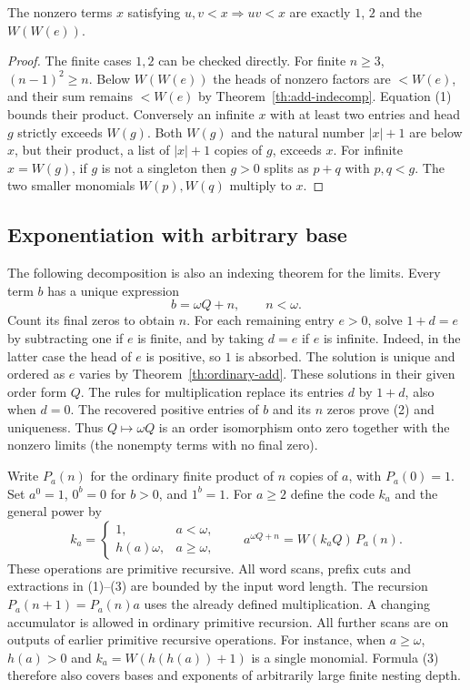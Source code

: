 \begin{corollary}
The nonzero terms $x$ satisfying
$u,v<x\Rightarrow uv<x$ are exactly $1$, $2$ and the $W(W(e))$.
\end{corollary}
\begin{proof}
The finite cases $1,2$ can be checked directly. For finite $n\ge3$,
$(n-1)^2\ge n$. Below $W(W(e))$ the heads of nonzero factors are
$<W(e)$, and their sum remains $<W(e)$ by Theorem~\ref{th:add-indecomp}.
Equation (1) bounds their product. Conversely an infinite $x$ with at
least two entries and head $g$ strictly exceeds $W(g)$. Both $W(g)$
and the natural number $|x|+1$ are below $x$, but their product, a list
of $|x|+1$ copies of $g$, exceeds $x$. For infinite $x=W(g)$, if
$g$ is not a singleton then $g>0$ splits as $p+q$ with $p,q<g$.
The two smaller monomials $W(p),W(q)$ multiply to $x$.
\end{proof}

\subsection{Exponentiation with arbitrary base}
The following decomposition is also an indexing theorem for the limits.
Every term $b$ has a unique expression
\[
                         b=\omega Q+n,\qquad n<\omega.            \tag{2}\label{eq:arith-omega-div}
\]
Count its final zeros to obtain $n$. For each remaining entry $e>0$,
solve $1+d=e$ by subtracting one if $e$ is finite, and by taking $d=e$
if $e$ is infinite. Indeed, in the latter case the head of $e$ is
positive, so $1$ is absorbed. The solution is unique and ordered as
$e$ varies by Theorem~\ref{th:ordinary-add}. These solutions in their
given order form $Q$. The rules for multiplication replace its entries
$d$ by $1+d$, also when $d=0$. The recovered positive entries of $b$
and its $n$ zeros prove (2) and uniqueness. Thus $Q\mapsto\omega Q$ is
an order isomorphism onto zero together with the nonzero limits (the
nonempty terms with no final zero).

Write $P_a(n)$ for the ordinary finite product of $n$ copies of $a$,
with $P_a(0)=1$. Set $a^0=1$, $0^b=0$ for $b>0$, and $1^b=1$.
For $a\ge2$ define the code $k_a$ and the general power by
\[
 k_a=\begin{cases}1,&a<\omega,\\ h(a)\omega,&a\ge\omega,\end{cases}
 \qquad
 a^{\omega Q+n}=W(k_a Q)\,P_a(n).                              \tag{3}\label{eq:arith-power}
\]
These operations are primitive recursive. All word scans, prefix cuts and
extractions in (1)--(3) are bounded by the input word length. The recursion
$P_a(n+1)=P_a(n)a$ uses the already defined multiplication. A changing
accumulator is allowed in ordinary primitive recursion. All further scans
are on outputs of earlier primitive recursive operations. For instance,
when $a\ge\omega$, $h(a)>0$ and $k_a=W(h(h(a))+1)$ is a single monomial.
Formula (3) therefore also covers bases and exponents of arbitrarily
large finite nesting depth.

